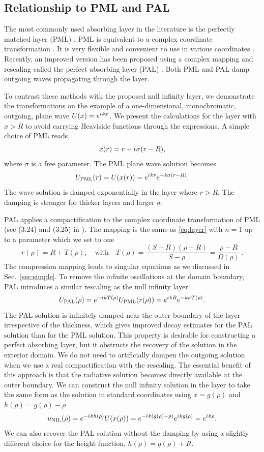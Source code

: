 \documentclass[final,onefignum,onetabnum]{siamart190516}
\newcommand{\be}{\begin{equation}}
\newcommand{\ee}{\end{equation}}
\newcommand{\iu}{{i\mkern1mu}}
\begin{document}
\subsection{Relationship to PML and PAL}
The most commonly used absorbing layer in the literature is the perfectly matched layer (PML) \cite{BERENGER1994185}. PML is equivalent to a complex coordinate transformation \cite{chew19943d}. It is very flexible and convenient to use in various coordinates \cite{collino1998perfectly}. Recently, an improved version has been proposed using a complex mapping and rescaling called the perfect absorbing layer (PAL) \cite{wang2017perfect, yang2021truly}. Both PML and PAL damp outgoing waves propagating through the layer.

To contrast these methods with the proposed null infinity layer, we demonstrate the transformations on the example of a one-dimensional, monochromatic, outgoing, plane wave $U(x)=e^{\iu kx}$. We present the calculations for the layer with $x>R$ to avoid carrying Heaviside functions through the expressions. A simple choice of PML reads 
\be\label{eq:pml} x(r) = r + \iu \sigma (r-R), \ee
where $\sigma$ is a free parameter. The PML plane wave solution becomes
\[ U_{\mathrm{PML}}(r) = U(x(r)) = e^{\iu k r} e^{- k \sigma (r-R)}. \]
The wave solution is damped exponentially in the layer where $r>R$. The damping is stronger for thicker layers and larger $\sigma$.

PAL applies a compactification to the complex coordinate transformation of PML (see (3.24) and (3.25) in \cite{yang2021truly}). The mapping is the same as \eqref{eq:layer} with $n=1$ up to a parameter which we set to one 
\[ r(\rho) = R + T(\rho), \quad \mathrm{with} \quad T(\rho) = \frac{(S-R)(\rho-R)}{S-\rho} = \frac{\rho-R}{\Omega(\rho)}\,. \]
The compression mapping leads to singular equations as we discussed in Sec.~\ref{sec:simple}. To remove the infinite oscillations at the domain boundary, PAL introduces a similar rescaling as the null infinity layer
\[ U_{\mathrm{PAL}}(\rho) = e^{-\iu k T(\rho)} U_{\mathrm{PML}}(r(\rho)) = e^{\iu k R} e^{-k \sigma T(\rho)}. \]
The PAL solution is infinitely damped near the outer boundary of the layer irrespective of the thickness, which gives improved decay estimates for the PAL solution than for the PML solution. This property is desirable for constructing a perfect absorbing layer, but it obstructs the recovery of the solution in the exterior domain. We do not need to artificially dampen the outgoing solution when we use a real compactification with the rescaling. The essential benefit of this approach is that the radiative solution becomes directly available at the outer boundary. We can construct the null infinity solution in the layer to take the same form as the solution in standard coordinates using $x=g(\rho)$ and $h(\rho) = g(\rho) - \rho$
\[ u_{\mathrm{NIL}}(\rho) = e^{-\iu k h(\rho)} U(x(\rho)) = e^{-\iu k (g(\rho)-\rho)} e^{\iu k g(\rho)} = e^{\iu k \rho}. \]
We can also recover the PAL solution without the damping by using a slightly different choice for the height function,  $h(\rho) = g(\rho) + R$.  
\end{document}
